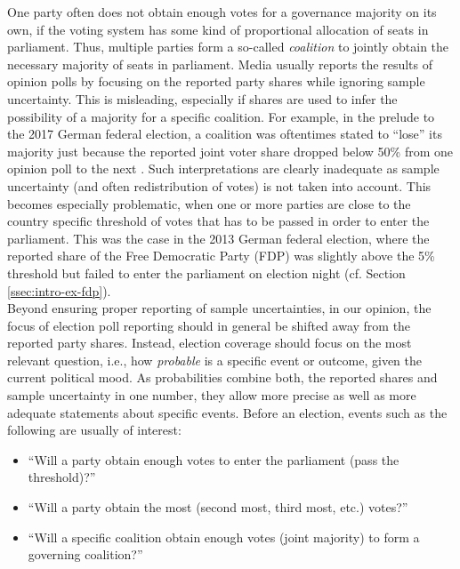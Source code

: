 \documentclass[smallcondensed]{svjour3_edited}     %
\begin{document}
One party often does not obtain enough votes for a governance majority on its own,
if the voting system has some kind of proportional allocation of seats in
parliament. Thus, multiple parties form
a so-called \emph{coalition} to jointly obtain the necessary majority of seats
in parliament. Media usually reports the results of opinion polls by focusing
on the reported party shares while ignoring sample uncertainty. This is misleading,
especially if shares are used to infer the possibility of a majority for
a specific coalition. For example, in the prelude to the 2017 German federal election,
a coalition was oftentimes stated to ``lose'' its majority just because the reported joint
voter share dropped below 50\% from one opinion poll to the next \citep[e.g.,][]{umfrage_2017}.
Such interpretations are clearly inadequate as sample uncertainty
(and often redistribution of votes) is not taken into account. This becomes especially
problematic, when one or more parties are close to the country specific threshold
of votes that has to be passed in order to enter the parliament. This was the case
in the 2013 German federal election, where the reported share of the Free Democratic
Party (FDP) was slightly above the 5\% threshold but failed to enter the
parliament on election night (cf. Section \ref{ssec:intro-ex-fdp}).\\


Beyond ensuring proper reporting of sample uncertainties, in our opinion, the
focus of election poll reporting should in general be shifted away from the
reported party shares. Instead, election coverage should focus on the most relevant
question, i.e., how {\it probable} is a specific event or outcome, given
the current political mood. As probabilities combine both, the reported shares and
sample uncertainty in one number, they allow more precise as well as more adequate
statements about specific events. Before an election, events such as the
following are usually of interest:

\begin{itemize}
  \item ``Will a party obtain enough votes to enter the parliament (pass the threshold)?''
  \item ``Will a party obtain the most (second most, third most, etc.) votes?''
  \item ``Will a specific coalition obtain enough votes (joint majority) to form a governing coalition?''
\end{itemize}
\end{document}
